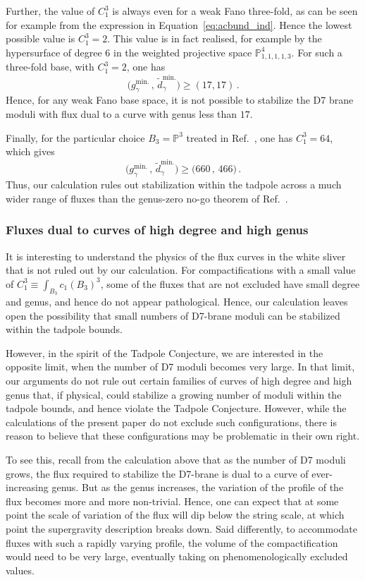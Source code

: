 \documentclass[a4paper,12pt]{article}
\numberwithin{equation}{section}
\newcommand{\mbb}{\mathbb}
\newcommand{\be}{\begin{equation}}
\newcommand{\ee}{\end{equation}}
\newcommand{\fthb}{B_3}				%
\newcommand{\crv}{\gamma}			%
\newcommand{\degr}[1]{\tilde{d}_{#1}}			%
\begin{document}
Further, the value of $C_1^3$ is always even for a weak Fano three-fold, as can be seen for example from the expression in Equation~\eqref{eq:acbund_ind}. Hence the lowest possible value is $C_1^3 = 2$. This value is in fact realised, for example by the hypersurface of degree 6 in the weighted projective space $\mbb{P}^4_{1,1,1,1,3}$. For such a three-fold base, with $C_1^3 = 2$, one has
\be
\big( g_\crv^\mathrm{min.} \,,\, \degr{\crv}^\mathrm{min.} \big) \geq ( 17 , 17 ) \,.
\ee
Hence, for any weak Fano base space, it is not possible to stabilize the D7 brane moduli with flux dual to a curve with genus less than $17$.

Finally, for the particular choice $\fthb = \mbb{P}^3$ treated in Ref.~\cite{Collinucci:2008pf}, one has $C_1^3 = 64$, which gives
\be
\big( g_\crv^\mathrm{min.} \,,\, \degr{\crv}^\mathrm{min.} \big) \geq \big(660 \,,\, 466) \,.
\ee
Thus, our calculation rules out stabilization within the tadpole across a much wider range of fluxes than the genus-zero no-go theorem of Ref.~\cite{Collinucci:2008pf}.

\subsubsection*{Fluxes dual to curves of high degree and high genus}

It is interesting to understand the physics of the flux curves in the white sliver that is not ruled out by our calculation. For compactifications with a small value of $C_1^3 \equiv \int_{\fthb}c_1(\fthb)^3$, some of the fluxes that are not excluded have small degree and genus, and hence do not appear pathological. Hence, our calculation leaves open the possibility that small numbers of D7-brane moduli can be stabilized within the tadpole bounds. 

However, in the spirit of the Tadpole Conjecture, we are interested in the opposite limit, when the number of D7 moduli becomes very large. In that limit, our arguments do not rule out certain families of curves of high degree and high genus that, if physical, could stabilize a growing number of moduli within the tadpole bounds, and hence violate the Tadpole Conjecture. However, while the calculations of the present paper do not exclude such configurations, there is reason to believe that these configurations may be problematic in their own right. 

To see this, recall from the calculation above that as the number of D7 moduli grows, the flux required to stabilize the D7-brane is dual to a curve of ever-increasing genus. But as the genus increases, the variation of the profile of the flux becomes more and more non-trivial. Hence, one can expect that at some point the scale of variation of the flux will dip below the string scale, at which point the supergravity description breaks down. Said differently, to accommodate fluxes with such a rapidly varying profile, the volume of the compactification would need to be very large, eventually taking on phenomenologically excluded values.
\end{document}
